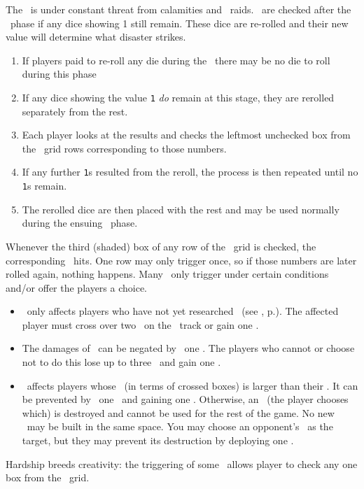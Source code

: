 The \planet\ is under constant threat from calamities and \pirate\ raids.  \disasters\ are checked after the \diplomacy\ phase if any dice showing 1 still remain.  These dice are re-rolled and their new value will determine what disaster strikes.
\begin{enumerate}
  \item If players paid to re-roll any die during the \diplomacy\ there may be no die to roll during this phase
  \item If any dice showing the value \texttt{1} \textit{do} remain at this stage, they are rerolled separately from the rest.
  \item Each player looks at the results and checks the leftmost unchecked box from the \disaster\ grid rows corresponding to those numbers.
  \item If any further \texttt{1}s resulted from the reroll, the process is then repeated until no \texttt{1}s remain.
  \item The rerolled dice are then placed with the rest and may be used normally during the ensuing \development\ phase.
\end{enumerate}
Whenever the third (shaded) box of any row of the \disaster\ grid is checked, the corresponding \disaster\ hits.  One row may only trigger once, so if those numbers are later rolled again, nothing happens.
\newline\newline
Many \disasters\ only trigger under certain conditions and/or offer the players a choice.
\begin{itemize}
  \item \pandemic\ only affects players who have not yet researched \cure\ (see , p.\pageref{sec:disasters}). The affected player must cross over two \astronauts\ on the \population\ track or gain one \unhappiness.
  \item The damages of \war\ can be negated by \deploying\ one \squadron.  The players who cannot or choose not to do this lose up to three \currency\ and gain one \unhappiness.
  \item \terrorism\ affects players whose \unhappiness\ (in terms of crossed boxes) is larger than their \happiness.  It can be prevented by \deploying\ one \squadron\ and gaining one \unhappiness.  Otherwise, an \armament\ (the player chooses which) is destroyed and cannot be used for the rest of the game.  No new \armaments\ may be built in the same space.  You may choose an opponent's \battleship\ as the target, but they may prevent its destruction by deploying one \squadron.
\end{itemize}
Hardship breeds creativity: the triggering of some \disasters\ allows player to check any one box from the \culture\ grid.
